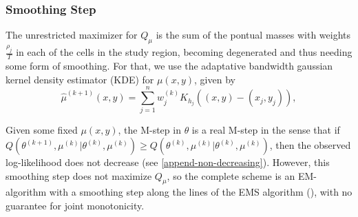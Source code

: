 \subsubsection{Smoothing Step}
\label{subsubsec-smoothing}

The unrestricted maximizer for $Q_{\mu}$ is the sum of the pontual masses with weights $\frac{\rho_{j}}{T}$ in each of the cells in the study region, becoming degenerated and thus needing some form of smoothing. For that, we use the adaptative bandwidth gaussian kernel density estimator (KDE) for $\mu(x,y)$, given by
\begin{equation}
  \label{eq-smoothing-mu}
  \hat\mu^{(k+1)}(x,y)=\sum_{j = 1}^{n}w_{j}^{(k)}K_{h_{j}}\left((x,y)-(x_{j},y_{j})\right),
\end{equation}

Given some fixed $\mu(x,y)$, the M-step in $\theta$ is a real M-step in the sense that if $Q\left(\theta^{(k + 1)},\mu^{(k)}|\theta^{(k)},\mu^{(k)}\right) \ge Q\left(\theta^{(k)},\mu^{(k)}|\theta^{(k)},\mu^{(k)}\right)$, then the observed log-likelihood does not decrease (see \autoref{append-non-decreasing}). However, this smoothing step does not maximize $Q_{\mu}$, so the complete scheme is an EM-algorithm with a smoothing step along the lines of the EMS algorithm (), with no guarantee for joint monotonicity.

